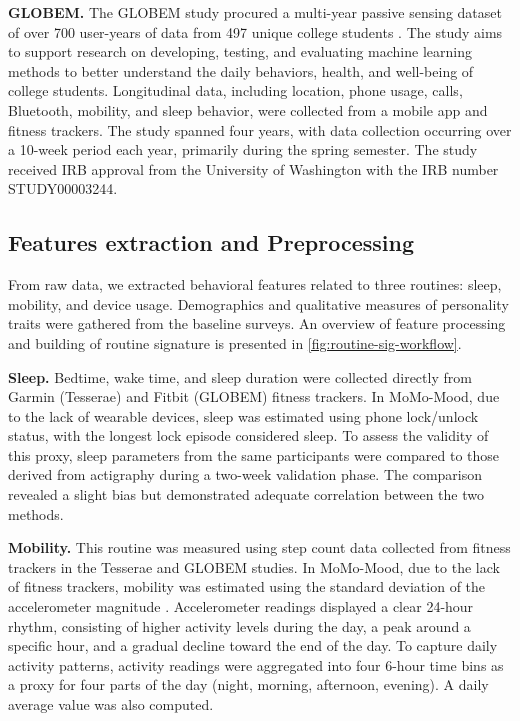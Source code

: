\documentclass[pdflatex,sn-vancouver,Numbered]{bst/sn-jnl}%
\theoremstyle{thmstyleone}%
\theoremstyle{thmstyletwo}%
\theoremstyle{thmstylethree}%
\begin{document}
\textbf{GLOBEM.} The GLOBEM study procured a multi-year passive sensing dataset of over 700 user-years of data from 497 unique college students \cite{xu2022globem}. The study aims to support research on developing, testing, and evaluating machine learning methods to better understand the daily behaviors, health, and well-being of college students. Longitudinal data, including location, phone usage, calls, Bluetooth, mobility, and sleep behavior, were collected from a mobile app and fitness trackers. The study spanned four years, with data collection occurring over a 10-week period each year, primarily during the spring semester. The study received IRB approval from the University of Washington with the IRB number STUDY00003244.

\subsection*{Features extraction and Preprocessing} \label{sec:methods:features_extraction}  

From raw data, we extracted behavioral features related to three routines: sleep, mobility, and device usage. Demographics and qualitative measures of personality traits were gathered from the baseline surveys. An overview of feature processing and building of routine signature is presented in \autoref{fig:routine-sig-workflow}.
 
\textbf{Sleep.} Bedtime, wake time, and sleep duration were collected directly from Garmin (Tesserae) and Fitbit (GLOBEM) fitness trackers. In MoMo-Mood, due to the lack of wearable devices, sleep was estimated using phone lock/unlock status, with the longest lock episode considered sleep. To assess the validity of this proxy, sleep parameters from the same participants were compared to those derived from actigraphy during a two-week validation phase. The comparison revealed a slight bias but demonstrated adequate correlation between the two methods.

\textbf{Mobility.} This routine was measured using step count data collected from fitness trackers in the Tesserae and GLOBEM studies. In MoMo-Mood, due to the lack of fitness trackers, mobility was estimated using the standard deviation of the accelerometer magnitude \cite{ravi2005activity}. Accelerometer readings displayed a clear 24-hour rhythm, consisting of higher activity levels during the day, a peak around a specific hour, and a gradual decline toward the end of the day. To capture daily activity patterns, activity readings were aggregated into four 6-hour time bins as a proxy for four parts of the day (night, morning, afternoon, evening). A daily average value was also computed.
\end{document}
